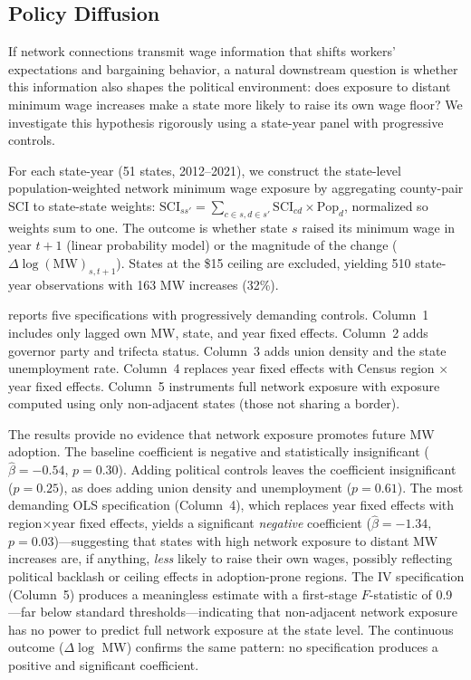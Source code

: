 \documentclass[12pt]{article}
\begin{document}
\subsection{Policy Diffusion}

If network connections transmit wage information that shifts workers' expectations and bargaining behavior, a natural downstream question is whether this information also shapes the political environment: does exposure to distant minimum wage increases make a state more likely to raise its own wage floor? We investigate this hypothesis rigorously using a state-year panel with progressive controls.

For each state-year (51 states, 2012--2021), we construct the state-level population-weighted network minimum wage exposure by aggregating county-pair SCI to state-state weights: $\text{SCI}_{ss'} = \sum_{c \in s, d \in s'} \text{SCI}_{cd} \times \text{Pop}_d$, normalized so weights sum to one. The outcome is whether state $s$ raised its minimum wage in year $t+1$ (linear probability model) or the magnitude of the change ($\Delta\log(\text{MW})_{s,t+1}$). States at the \$15 ceiling are excluded, yielding 510 state-year observations with 163 MW increases (32\%).

 reports five specifications with progressively demanding controls. Column~1 includes only lagged own MW, state, and year fixed effects. Column~2 adds governor party and trifecta status. Column~3 adds union density and the state unemployment rate. Column~4 replaces year fixed effects with Census region $\times$ year fixed effects. Column~5 instruments full network exposure with exposure computed using only non-adjacent states (those not sharing a border).

The results provide no evidence that network exposure promotes future MW adoption. The baseline coefficient is negative and statistically insignificant ($\hat{\beta} = -0.54$, $p = 0.30$). Adding political controls leaves the coefficient insignificant ($p = 0.25$), as does adding union density and unemployment ($p = 0.61$). The most demanding OLS specification (Column~4), which replaces year fixed effects with region$\times$year fixed effects, yields a significant \textit{negative} coefficient ($\hat{\beta} = -1.34$, $p = 0.03$)---suggesting that states with high network exposure to distant MW increases are, if anything, \textit{less} likely to raise their own wages, possibly reflecting political backlash or ceiling effects in adoption-prone regions. The IV specification (Column~5) produces a meaningless estimate with a first-stage $F$-statistic of 0.9---far below standard thresholds---indicating that non-adjacent network exposure has no power to predict full network exposure at the state level. The continuous outcome ($\Delta\log$ MW) confirms the same pattern: no specification produces a positive and significant coefficient.
\end{document}
